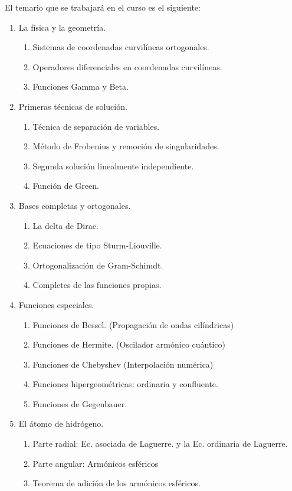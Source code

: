 \documentclass[12pt]{article}
\numberwithin{equation}{section}
\begin{document}
El temario que se trabajará en el curso es el siguiente:
\begin{enumerate}
\item La física y la geometría.
\begin{enumerate}
\item Sistemas de coordenadas curvilíneas ortogonales.
\item Operadores diferenciales en coordenadas curvilíneas.
\item Funciones Gamma y Beta.
\end{enumerate}
\item Primeras técnicas de solución.
\begin{enumerate}
\item Técnica de separación de variables.
\item Método de Frobenius y remoción de singularidades.
\item Segunda solución linealmente independiente.
\item Función de Green.
\end{enumerate}
\item Bases completas y ortogonales.
\begin{enumerate}
\item La delta de Dirac. 
\item Ecuaciones de tipo Sturm-Liouville.
\item Ortogonalización de Gram-Schimdt.
\item Completes de las funciones propias.
\end{enumerate}
\item Funciones especiales.
\begin{enumerate}
\item Funciones de Bessel. (Propagación de ondas cilíndricas)
\item Funciones de Hermite. (Oscilador armónico cuántico)
\item Funciones de Chebyshev (Interpolación numérica)
\item Funciones hipergeométricas: ordinaria y confluente.
\item Funciones de Gegenbauer.
\end{enumerate}
\item El átomo de hidrógeno.
\begin{enumerate}
\item Parte radial: Ec. asociada de Laguerre. y la Ec. ordinaria de Laguerre.
\item Parte angular: Armónicos esféricos
\item Teorema de adición de los armónicos esféricos.

\end{enumerate}
\end{enumerate}
\end{document}
